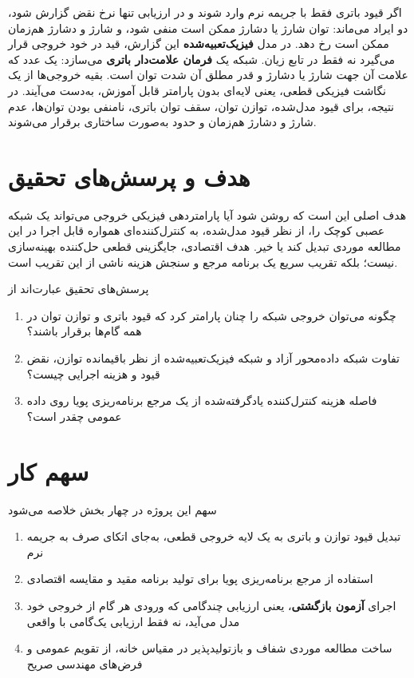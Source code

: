 اگر قیود باتری فقط با جریمه نرم وارد شوند و در ارزیابی تنها نرخ نقض  گزارش شود، دو ایراد می‌ماند: توان شارژ یا دشارژ ممکن است منفی شود، و شارژ و دشارژ هم‌زمان ممکن است رخ دهد. در مدل \textbf{فیزیک‌تعبیه‌شده} این گزارش، قید در خود خروجی قرار می‌گیرد نه فقط در تابع زیان. شبکه یک \textbf{فرمان علامت‌دار باتری} می‌سازد: یک عدد که علامت آن جهت شارژ یا دشارژ و قدر مطلق آن شدت توان است. بقیه خروجی‌ها از یک نگاشت فیزیکی قطعی، یعنی لایه‌ای بدون پارامتر قابل آموزش، به‌دست می‌آیند. در نتیجه، برای قیود مدل‌شده، توازن توان، سقف توان باتری، نامنفی بودن توان‌ها، عدم شارژ و دشارژ هم‌زمان و حدود  به‌صورت ساختاری برقرار می‌شوند.

\section{هدف و پرسش‌های تحقیق}
هدف اصلی این است که روشن شود آیا پارامتردهی فیزیکی خروجی می‌تواند یک شبکه عصبی کوچک را، از نظر قیود مدل‌شده، به کنترل‌کننده‌ای همواره قابل اجرا در این مطالعه موردی تبدیل کند یا خیر. هدف اقتصادی، جایگزینی قطعی حل‌کننده بهینه‌سازی نیست؛ بلکه تقریب سریع یک برنامه مرجع و سنجش هزینه ناشی از این تقریب است.

پرسش‌های تحقیق عبارت‌اند از
\begin{enumerate}
  \item چگونه می‌توان خروجی شبکه را چنان پارامتر کرد که قیود باتری و توازن توان در همه گام‌ها برقرار باشند؟
  \item تفاوت شبکه داده‌محور آزاد و شبکه فیزیک‌تعبیه‌شده از نظر باقیمانده توازن، نقض قیود و هزینه اجرایی چیست؟
  \item فاصله هزینه کنترل‌کننده یادگرفته‌شده از یک مرجع برنامه‌ریزی پویا روی داده عمومی چقدر است؟
\end{enumerate}

\section{سهم کار}
سهم این پروژه در چهار بخش خلاصه می‌شود
\begin{enumerate}
  \item تبدیل قیود توازن و باتری به یک لایه خروجی قطعی، به‌جای اتکای صرف به جریمه نرم
  \item استفاده از مرجع برنامه‌ریزی پویا برای تولید برنامه مقید و مقایسه اقتصادی
  \item اجرای \textbf{آزمون بازگشتی}، یعنی ارزیابی چندگامی که  ورودی هر گام از خروجی خود مدل می‌آید، نه فقط ارزیابی یک‌گامی با  واقعی
  \item ساخت مطالعه موردی شفاف و بازتولیدپذیر در مقیاس خانه، از تقویم عمومی و فرض‌های مهندسی صریح
\end{enumerate}


